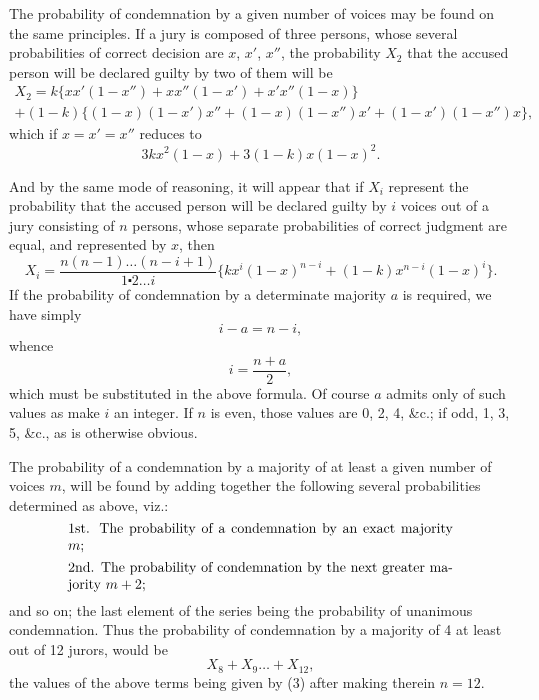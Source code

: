 \documentclass[oneside]{book}
\begin{document}
The probability of condemnation by a given number of voices
may be found on the same principles. If a jury is composed of
three persons, whose several probabilities of correct decision are
$x$, $x'$, $x''$, the probability $X_2$ that the accused person will be declared guilty by two of them will be
\[
\begin{split}
  X_2 = k \{xx'(1-x'') + xx''(1-x') + x'x''(1-x)\}   \\
      + (1-k)\{(1-x)(1-x')x'' + (1-x)(1-x'')x' + (1-x')(1-x'')x\},
\end{split}
\]
which if $x = x' = x''$ reduces to
\[
  3kx^2(1-x) + 3(1-k)x(1-x)^2.
\]

And by the same mode of reasoning, it will appear that if
$X_i$ represent the probability that the accused person will be declared guilty by $i$ voices out of a jury consisting of $n$ persons,
whose separate probabilities of correct judgment are equal, and
represented by $x$, then
\[
  X_i = \frac{n(n-1) \dotsc (n-i+1)}{1 \centerdot 2 \dotsc i}
        \{ kx^i(1-x)^{n-i} + (1-k)x^{n-i}(1-x)^i \}.         \tag{3}
\]
If the probability of condemnation by a determinate majority $a$
is required, we have simply
\[
  i - a = n - i,
\]
whence
\[
  i = \frac{n+a}{2},
\]
which must be substituted in the above formula. Of course $a$
admits only of such values as make $i$ an integer. If $n$ is even,
those values are 0, 2, 4, \&c.; if odd, 1, 3, 5, \&c., as is otherwise
obvious.

The probability of a condemnation by a majority of at least a
given number of voices $m$, will be found by adding together the
following several probabilities determined as above, viz.:
\begin{equation*}\begin{minipage}{.8\linewidth}
1st. The probability of a condemnation by an exact majority $m$;
\end{minipage}\end{equation*}
\begin{equation*}\begin{minipage}{.8\linewidth}
2nd. The probability of condemnation by the next greater
majority $m + 2$;
\end{minipage}\end{equation*}
and so on; the last element of the series being the probability of
unanimous condemnation. Thus the probability of condemnation
by a majority of 4 at least out of 12 jurors, would be
\begin{equation*}
X_8 + X_9 \dotsc + X_{12},
\end{equation*}
the values of the above terms being given by (3) after making
therein $n = 12$.
\end{document}
